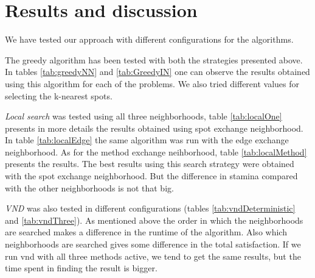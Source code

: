 \documentclass{article}
\begin{document}



\section{Results and discussion}

We have tested our approach with different configurations for the algorithms. 

The greedy algorithm has been tested with both the strategies presented above. In tables \ref{tab:greedyNN} and \ref{tab:GreedyIN} one can observe the results obtained using this algorithm for each of the problems. We also tried different values for selecting the k-nearest spots. 
\medskip

\emph{Local search} was tested using all three neighborhoods, table \ref{tab:localOne} presents in more details the results obtained using spot exchange neighborhood. In table \ref{tab:localEdge} the same algorithm was run with the edge exchange neighborhood. As for the method exchange neihborhood, table \ref{tab:localMethod} presents the results. The best results using this search strategy were obtained with the spot exchange neighborhood. But the difference in stamina compared with the other neighborhoods is not that big. 
\medskip

\emph{VND} was also tested in different configurations (tables \ref{tab:vndDeterministic} and \ref{tab:vndThree}). As mentioned above the order in which the neighborhoods are searched makes a difference in the runtime of the algorithm. Also which neighborhoods are searched gives some difference in the total satisfaction. If we run vnd with all three methods active, we tend to get the same results, but the time spent in finding the result is bigger.  
\medskip
\end{document}

